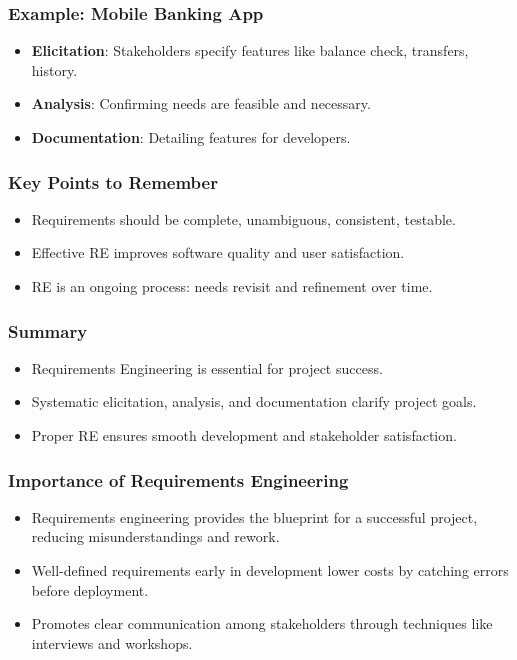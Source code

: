\documentclass{beamer}
\begin{document}
\begin{frame}[fragile]
    \frametitle{Example: Mobile Banking App}
    \begin{itemize}
        \item \textbf{Elicitation}: Stakeholders specify features like balance check, transfers, history.
        \item \textbf{Analysis}: Confirming needs are feasible and necessary.
        \item \textbf{Documentation}: Detailing features for developers.
    \end{itemize}
\end{frame}

\begin{frame}[fragile]
    \frametitle{Key Points to Remember}
    \begin{itemize}
        \item Requirements should be complete, unambiguous, consistent, testable.
        \item Effective RE improves software quality and user satisfaction.
        \item RE is an ongoing process: needs revisit and refinement over time.
    \end{itemize}
\end{frame}

\begin{frame}[fragile]
    \frametitle{Summary}
    \begin{itemize}
        \item Requirements Engineering is essential for project success.
        \item Systematic elicitation, analysis, and documentation clarify project goals.
        \item Proper RE ensures smooth development and stakeholder satisfaction.
    \end{itemize}
\end{frame}

\begin{frame}[fragile]
  \frametitle{Importance of Requirements Engineering}
  \begin{itemize}
    \item Requirements engineering provides the blueprint for a successful project, reducing misunderstandings and rework.
    \item Well-defined requirements early in development lower costs by catching errors before deployment.
    \item Promotes clear communication among stakeholders through techniques like interviews and workshops.
  \end{itemize}
\end{frame}
\end{document}

